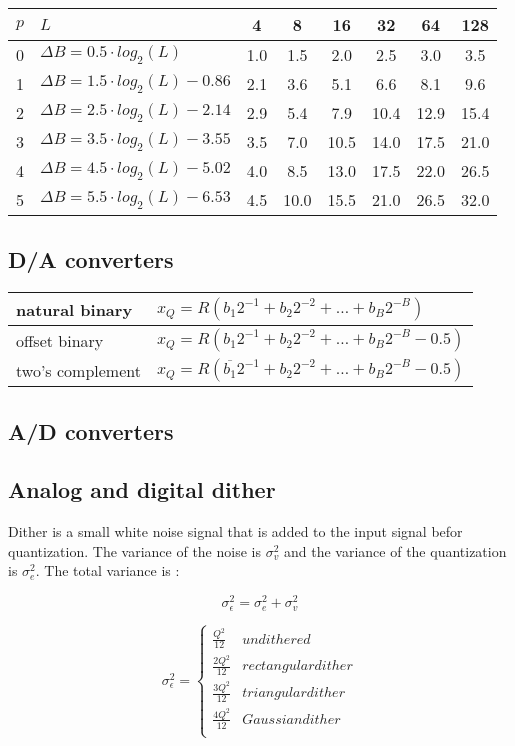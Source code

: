 \begin{tabularx}{0.75\textwidth}{|c|X|c|c|c|c|c|c|}
	\hline
	$p$	& $L$							& 4		& 8		& 16	& 32	& 64	& 128
	\\ \hline
	0	& $\Delta B =0.5 \cdot log_2(L)$		& 1.0	& 1.5	& 2.0	& 2.5	& 3.0	& 3.5 \\
	1	& $\Delta B =1.5 \cdot log_2(L) - 0.86$ & 2.1	& 3.6	& 5.1	& 6.6	& 8.1	& 9.6 \\
	2	& $\Delta B =2.5 \cdot log_2(L) - 2.14$	& 2.9	& 5.4	& 7.9	& 10.4	& 12.9	& 15.4 \\
	3	& $\Delta B =3.5 \cdot log_2(L) - 3.55$	& 3.5	& 7.0	& 10.5	& 14.0	& 17.5	& 21.0 \\
	4	& $\Delta B =4.5 \cdot log_2(L) - 5.02$	& 4.0	& 8.5	& 13.0	& 17.5	& 22.0	& 26.5 \\
	5	& $\Delta B =5.5 \cdot log_2(L) - 6.53$	& 4.5	& 10.0	& 15.5	& 21.0	& 26.5	& 32.0 \\
	\hline
\end{tabularx}
\resetArrayStretch


\subsection{D/A converters}
\begin{tabularx}{0.75\textwidth}{|l|X|}
	\hline
	natural binary & $x_Q = R(b_1 2^{-1} + b_2 2^{-2} + \ldots + b_B 2^{-B})$
	\\ \hline
	offset binary	& $x_Q = R(b_1 2^{-1} + b_2 2^{-2} + \ldots + b_B 2^{-B} - 0.5)$
	\\ \hline
	two's complement & $x_Q = R(\overline{b_1} 2^{-1} + b_2 2^{-2} + \ldots + b_B 2^{-B} - 0.5)$
	\\ \hline
\end{tabularx}


\subsection{A/D converters}
\subsection{Analog and digital dither}
Dither is a small white noise signal that is added to the input signal befor quantization. The variance of the noise is $\sigma_v^2$ and the variance of the quantization is $\sigma_e^2$. The total variance is :

\[ \sigma_{\epsilon}^2 = \sigma_e^2 + \sigma_v^2 \]

\begin{equation}
	\sigma_{\epsilon}^2 = 
	\begin{cases}
		\frac{Q^2}{12} & undithered \\
		\frac{2Q^2}{12} & rectangular dither \\
		\frac{3Q^2}{12} & triangular dither \\
		\frac{4Q^2}{12} & Gaussian dither \\
	\end{cases}
\end{equation}
